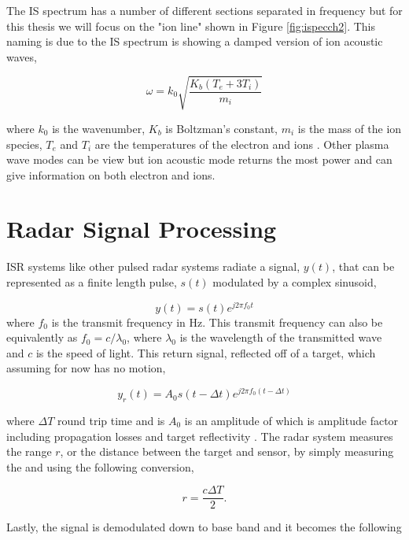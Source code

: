 The IS spectrum has a number of different sections separated in frequency but for this thesis we will focus on the "ion line" shown in Figure \ref{fig:ispecch2}. This naming is due to the IS spectrum is showing a damped version of ion acoustic waves,

\begin{equation} 
\label{eqn:ial}
\omega=k_0\sqrt{\frac{K_b(T_e+3T_i)}{m_i}}
\end{equation}

 \noindent where $k_0$ is the wavenumber, $K_b$ is Boltzman's constant, $m_i$ is the mass of the ion species, $T_e$ and $T_i$ are the temperatures of the electron and ions \cite{chen1984introduction}. Other plasma wave modes can be view but ion acoustic mode returns the most power and can give information on both electron and ions.

\section{Radar Signal Processing}
ISR systems like other pulsed radar systems radiate a signal, $y(t)$, that can be represented as a finite length pulse, $s(t)$ modulated by a complex sinusoid,

\begin{equation}
\label{eqn:sigone}
y(t)=s(t)e^{j2\pi f_0 t}
\end{equation}
\noindent where $f_0$ is the transmit frequency in Hz. This transmit frequency can also be equivalently as $ f_0=c/\lambda_0$, where $\lambda_0$ is the wavelength of the transmitted wave and $c$ is the speed of light. This return signal, reflected off of a target, which assuming for now has no motion,

\begin{equation}
\label{eqn:sigone}
y_r(t)=A_0s(t-\Delta t)e^{j2\pi f_0 (t-\Delta t)}
\end{equation}

\noindent where $\Delta T$ round trip time and is $A_0$  is an amplitude of which is amplitude factor including propagation losses and target reflectivity \cite{richards2014fundamentals}. The radar system measures the range $r$, or the distance between the target and sensor, by simply measuring the and using the following conversion,

\begin{equation}
\label{eqn:range_intro}
r=\frac{c\Delta T}{2}.
\end{equation}

\noindent Lastly, the signal is demodulated down to base band and it becomes the following

